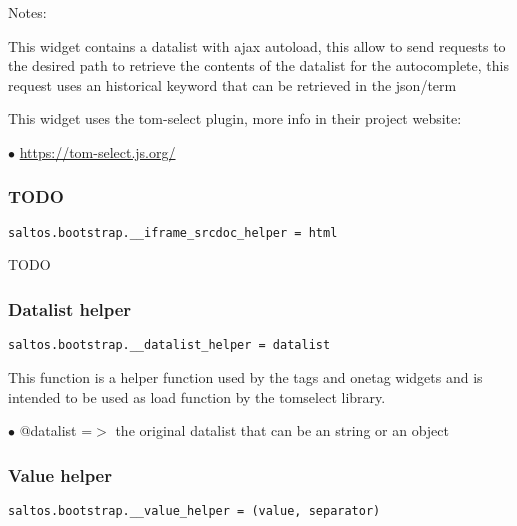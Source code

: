 \documentclass[a4paper]{article}
\def\htmladdnormallink#1#2{\href{#2}{#1}}
\begin{document}
Notes:

This widget contains a datalist with ajax autoload, this allow to send requests
to the desired path to retrieve the contents of the datalist for the autocomplete,
this request uses an historical keyword that can be retrieved in the json/term

This widget uses the tom-select plugin, more info in their project website:

\begin{compactitem}
\item[\color{myblue}$\bullet$] \htmladdnormallink{https://tom-select.js.org/}{https://tom-select.js.org/}
\end{compactitem}

\hypertarget{toc639}{}
\subsubsection{TODO}

\begin{lstlisting}
saltos.bootstrap.__iframe_srcdoc_helper = html
\end{lstlisting}

TODO

\hypertarget{toc640}{}
\subsubsection{Datalist helper}

\begin{lstlisting}
saltos.bootstrap.__datalist_helper = datalist
\end{lstlisting}

This function is a helper function used by the tags and onetag widgets
and is intended to be used as load function by the tomselect library.

\begin{compactitem}
\item[\color{myblue}$\bullet$] @datalist =$>$ the original datalist that can be an string or an object
\end{compactitem}

\hypertarget{toc641}{}
\subsubsection{Value helper}

\begin{lstlisting}
saltos.bootstrap.__value_helper = (value, separator)
\end{lstlisting}
\end{document}
